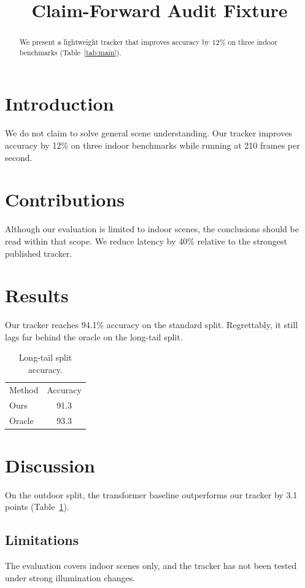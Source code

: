 \documentclass{article}
\title{Claim-Forward Audit Fixture}
\begin{document}
\begin{abstract}
We present a lightweight tracker that improves accuracy by 12\% on three indoor benchmarks (Table~\ref{tab:main}).
\end{abstract}

\section{Introduction}
We do not claim to solve general scene understanding.
Our tracker improves accuracy by 12\% on three indoor benchmarks while running at 210 frames per second.

\section{Contributions}
Although our evaluation is limited to indoor scenes, the conclusions should be read within that scope.
We reduce latency by 40\% relative to the strongest published tracker.

\section{Results}
Our tracker reaches 94.1\% accuracy on the standard split.
Regrettably, it still lags far behind the oracle on the long-tail split.
\begin{table}[h]
\centering
\caption{Long-tail split accuracy.}
\label{tab:main}
\begin{tabular}{lc}
Method & Accuracy \\
Ours & 91.3 \\
Oracle & 93.3 \\
\end{tabular}
\end{table}

\section{Discussion}
On the outdoor split, the transformer baseline outperforms our tracker by 3.1 points (Table~\ref{tab:main}).

\subsection{Limitations}
The evaluation covers indoor scenes only, and the tracker has not been tested under strong illumination changes.
\end{document}
